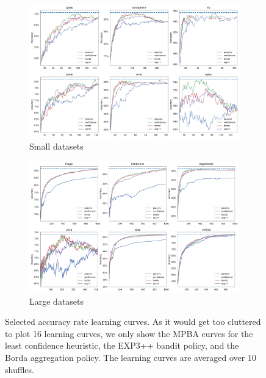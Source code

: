 \documentclass[fleqn,10pt,lineno]{wlpeerj} %
\begin{document}
\begin{figure}[tbp]
	\centering
	\begin{subfigure}[t]{\textwidth}
        \centering
        \includegraphics[width=\textwidth]{figures/learning_curves-accuracy-small}
        \caption{Small datasets}
	\end{subfigure}
	\begin{subfigure}[t]{\textwidth}
        \centering
        \includegraphics[width=\textwidth]{figures/learning_curves-accuracy-large}
        \caption{Large datasets}
    \end{subfigure}
	\caption[Selected learning curves]{Selected accuracy rate learning curves.
	As it would get too cluttered to plot 16 learning curves, we only show the
	MPBA curves for the least confidence heuristic, the EXP3++ bandit policy,
	and the Borda aggregation policy. The learning curves are averaged over 10
	shuffles.}
	\label{fig:learning_curves-accuracy}
\end{figure}
\end{document}

